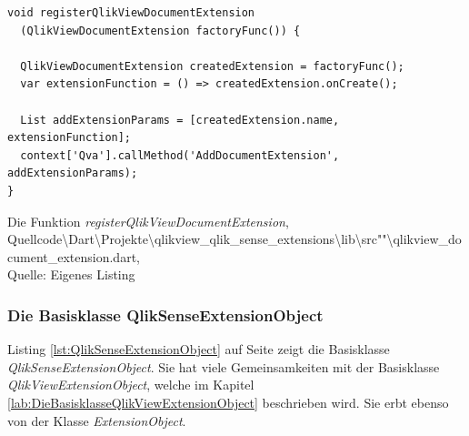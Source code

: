 \begin{listing}[htbp]
\begin{verbatim}
void registerQlikViewDocumentExtension
  (QlikViewDocumentExtension factoryFunc()) {
  
  QlikViewDocumentExtension createdExtension = factoryFunc();
  var extensionFunction = () => createdExtension.onCreate();

  List addExtensionParams = [createdExtension.name, extensionFunction];
  context['Qva'].callMethod('AddDocumentExtension', addExtensionParams);
}
\end{verbatim}
\caption[Die Funktion \textit{registerQlikViewDocumentExtension}]{Die Funktion \textit{registerQlikViewDocumentExtension}, \\Quellcode\textbackslash{}Dart\textbackslash{}Projekte\textbackslash{}qlikview\_qlik\_sense\_extensions\textbackslash{}lib\textbackslash{}src""\textbackslash{}qlikview\_document\_extension.dart, \\Quelle: Eigenes Listing}
\label{lst:registerQlikViewDocumentExtension}
\end{listing}


\subsubsection{Die Basisklasse QlikSenseExtensionObject}
\label{lab:DieBasisklasseQlikSenseExtensionObject}

Listing \ref{lst:QlikSenseExtensionObject} auf Seite \pageref{lst:QlikSenseExtensionObject} zeigt die Basisklasse \textit{QlikSenseExtensionObject}. Sie hat viele Gemeinsam\-keiten mit der Basisklasse \textit{QlikViewExtensionObject}, welche im Kapitel \ref{lab:DieBasisklasseQlikViewExtensionObject} beschrieben wird. Sie erbt ebenso von der Klasse \textit{ExtensionObject}. 


